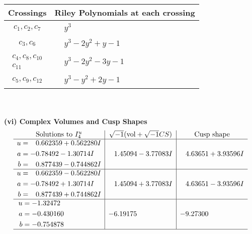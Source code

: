 \documentclass[1p]{elsarticle_modified}
\theoremstyle{definition}
\newcommand{\I}{\sqrt{-1}}
\begin{document}
\begin{tabular}{m{50pt}|m{274pt}}
Crossings & \hspace{64pt}Riley Polynomials at each crossing \\
\hline $$\begin{aligned}c_{1},c_{2},c_{7}\end{aligned}$$&$\begin{aligned}
&y^3
\end{aligned}$\\
\hline $$\begin{aligned}c_{3},c_{6}\end{aligned}$$&$\begin{aligned}
&y^3-2 y^2+y-1
\end{aligned}$\\
\hline $$\begin{aligned}c_{4},c_{8},c_{10}\\c_{11}\end{aligned}$$&$\begin{aligned}
&y^3-2 y^2-3 y-1
\end{aligned}$\\
\hline $$\begin{aligned}c_{5},c_{9},c_{12}\end{aligned}$$&$\begin{aligned}
&y^3- y^2+2 y-1
\end{aligned}$\\
\hline
\end{tabular}\\~\\
\newpage\flushleft \textbf{(vi) Complex Volumes and Cusp Shapes}
$$\begin{array}{c|c|c}  
\text{Solutions to }I^u_{4}& \I (\text{vol} + \sqrt{-1}CS) & \text{Cusp shape}\\
 \hline 
\begin{aligned}
u &= \phantom{-}0.662359 + 0.562280 I \\
a &= -0.78492 - 1.30714 I \\
b &= \phantom{-}0.877439 - 0.744862 I\end{aligned}
 & \phantom{-}1.45094 - 3.77083 I & \phantom{-}4.63651 + 3.93596 I \\ \hline\begin{aligned}
u &= \phantom{-}0.662359 - 0.562280 I \\
a &= -0.78492 + 1.30714 I \\
b &= \phantom{-}0.877439 + 0.744862 I\end{aligned}
 & \phantom{-}1.45094 + 3.77083 I & \phantom{-}4.63651 - 3.93596 I \\ \hline\begin{aligned}
u &= -1.32472\phantom{ +0.000000I} \\
a &= -0.430160\phantom{ +0.000000I} \\
b &= -0.754878\phantom{ +0.000000I}\end{aligned}
 & -6.19175\phantom{ +0.000000I} & -9.27300\phantom{ +0.000000I}\\
 \hline 
 \end{array}$$\newpage\newpage\renewcommand{\arraystretch}{1}
\end{document}

